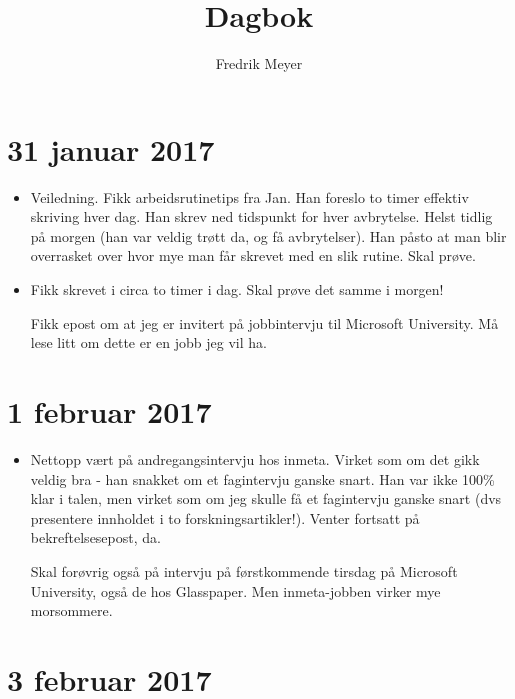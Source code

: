 \documentclass[11pt, norsk]{article}
\begin{document}
\title{Dagbok}
\author{Fredrik Meyer}
\maketitle

\section{31 januar 2017}

\begin{itemize}
  \item Veiledning. Fikk arbeidsrutinetips fra Jan. Han foreslo to timer effektiv skriving hver dag. Han skrev ned tidspunkt for hver avbrytelse. Helst tidlig på morgen (han var veldig trøtt da, og få avbrytelser). Han påsto at man blir overrasket over hvor mye man får skrevet med en slik rutine. Skal prøve.

\item Fikk skrevet i circa to timer i dag. Skal prøve det samme i morgen!

Fikk epost om at jeg er invitert på jobbintervju til Microsoft University. Må lese litt om dette er en jobb jeg vil ha.
\end{itemize}

\section{1 februar 2017} %
\label{sec:1_februar_2017}

\begin{itemize}
  \item Nettopp vært på andregangsintervju hos inmeta. Virket som om det gikk veldig bra - han snakket om et fagintervju ganske snart. Han var ikke 100\% klar i talen, men virket som om jeg skulle få et fagintervju ganske snart (dvs presentere innholdet i to forskningsartikler!). Venter fortsatt på bekreftelsesepost, da.

  Skal forøvrig også på intervju på førstkommende tirsdag på Microsoft University, også de hos Glasspaper. Men inmeta-jobben virker mye morsommere.
\end{itemize}

\section{3 februar 2017} %
\label{sec:3_februar_2017}
\end{document}
